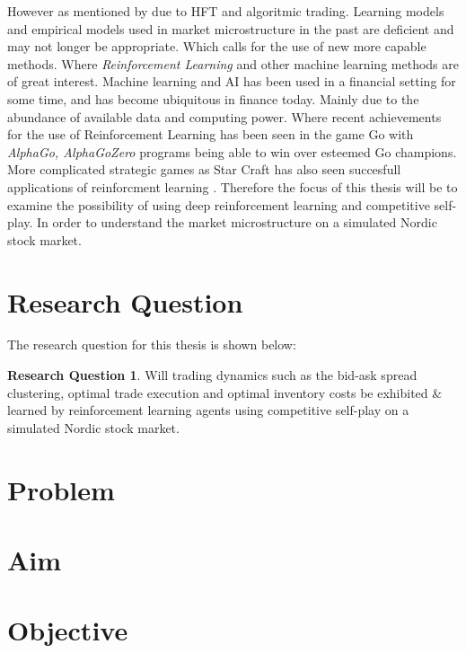 \documentclass{kththesis}
\theoremstyle{definition}
\newtheorem{RQ}{Research Question}[section]
\begin{document}
However as mentioned by \textcite{o2015high} due to HFT and algoritmic trading. Learning models and empirical models used in market microstructure in the past are deficient and may not longer be appropriate. Which calls for the use of new more capable methods. Where \textit{Reinforcement Learning} and other machine learning methods are of great interest. Machine learning and AI has been used in a financial setting for some time, and has become ubiquitous in finance today. Mainly due to the abundance of available data and computing power. 
\newline
\newline
Where recent achievements for the use of Reinforcement Learning has been seen in the game Go with \textit{AlphaGo, AlphaGoZero} \parencite{silver2016mastering} programs being able to win over esteemed Go champions. More complicated strategic games as Star Craft has also seen succesfull applications of reinforcment learning \parencite{vinyals2017starcraft}. Therefore the focus of this thesis will be to examine the possibility of using deep reinforcement learning and competitive self-play. In order to understand the market microstructure on a simulated Nordic stock market.

\section{Research Question}
The research question for this thesis is shown below:

\begin{RQ}
Will trading dynamics such as the bid-ask spread clustering, optimal trade execution and optimal inventory costs be exhibited \& learned by reinforcement learning agents using competitive self-play on a simulated Nordic stock market.
\end{RQ}


 



\section{Problem}

\section{Aim}

\section{Objective}
\end{document}
